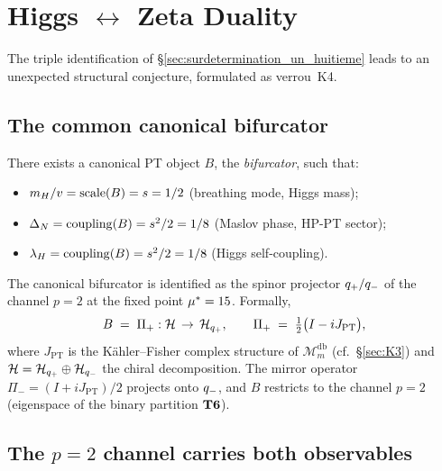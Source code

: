 \section{Higgs $\leftrightarrow$ Zeta Duality}
\label{sec:dualite_higgs_zeta}
\label{sec:dualite_higgs}

The triple identification of \S\ref{sec:surdetermination_un_huitieme}
leads to an unexpected structural conjecture, formulated as
verrou~K4.

\subsection{The common canonical bifurcator}
\label{sec:bifurcateur}

\begin{conjecture}
\label{conj:K4}
There exists a canonical PT object $B$, the \emph{bifurcator}, such that:
\begin{itemize}[nosep,leftmargin=*]
\item $m_H / v = \mathrm{scale}(B) = s = 1/2$ (breathing mode,
  Higgs mass);
\item $\Delta_N = \mathrm{coupling}(B) = s^{2}/2 = 1/8$ (Maslov
  phase, HP-PT sector);
\item $\lambda_H = \mathrm{coupling}(B) = s^{2}/2 = 1/8$ (Higgs
  self-coupling).
\end{itemize}
\end{conjecture}

The canonical bifurcator is identified as the spinor projector
$q_{+}/q_{-}$ of the channel $p = 2$ at the fixed point
$\mu^{*} = 15$. Formally,
\begin{equation}
B \;=\; \Pi_+ : \mathcal{H} \,\to\, \mathcal{H}_{q_{+}}, \qquad
\Pi_+ \;=\; \tfrac{1}{2}\big(I - i J_{\mathrm{PT}}\big),
\label{eq:bifurcateur}
\end{equation}
where $J_{\mathrm{PT}}$ is the K\"ahler--Fisher complex structure of
$\mathcal{M}_m^{\mathrm{db}}$ (cf.~\S\ref{sec:K3}) and $\mathcal{H} = \mathcal{H}_{q_{+}}
\oplus \mathcal{H}_{q_{-}}$ the chiral decomposition. The mirror operator
$\Pi_- = (I + i J_{\mathrm{PT}})/2$ projects onto $q_{-}$, and $B$
restricts to the channel $p = 2$ (eigenspace of the binary partition
$\textbf{T6}$).

\subsection{The $p = 2$ channel carries both observables}
\label{sec:canal_p2}

